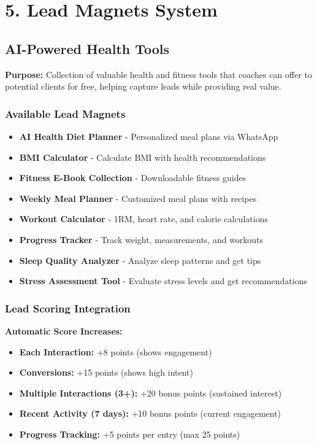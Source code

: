 \documentclass[12pt,a4paper]{article}
\begin{document}
\section{5. Lead Magnets System}

\subsection{AI-Powered Health Tools}
\textbf{Purpose:} Collection of valuable health and fitness tools that coaches can offer to potential clients for free, helping capture leads while providing real value.

\subsubsection{Available Lead Magnets}
\begin{itemize}
    \item \textbf{AI Health Diet Planner} - Personalized meal plans via WhatsApp
    \item \textbf{BMI Calculator} - Calculate BMI with health recommendations
    \item \textbf{Fitness E-Book Collection} - Downloadable fitness guides
    \item \textbf{Weekly Meal Planner} - Customized meal plans with recipes
    \item \textbf{Workout Calculator} - 1RM, heart rate, and calorie calculations
    \item \textbf{Progress Tracker} - Track weight, measurements, and workouts
    \item \textbf{Sleep Quality Analyzer} - Analyze sleep patterns and get tips
    \item \textbf{Stress Assessment Tool} - Evaluate stress levels and get recommendations
\end{itemize}

\subsubsection{Lead Scoring Integration}
\textbf{Automatic Score Increases:}
\begin{itemize}
    \item \textbf{Each Interaction:} +8 points (shows engagement)
    \item \textbf{Conversions:} +15 points (shows high intent)
    \item \textbf{Multiple Interactions (3+):} +20 bonus points (sustained interest)
    \item \textbf{Recent Activity (7 days):} +10 bonus points (current engagement)
    \item \textbf{Progress Tracking:} +5 points per entry (max 25 points)
\end{itemize}
\end{document}

